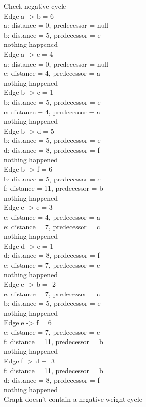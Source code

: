 \noindent Check negative cycle\\
Edge a -> b = 6\\
a: distance = 0, predecessor = null\\
b: distance = 5, predecessor = e\\
nothing happened\\
Edge a -> c = 4\\
a: distance = 0, predecessor = null\\
c: distance = 4, predecessor = a\\
nothing happened\\
Edge b -> c = 1\\
b: distance = 5, predecessor = e\\
c: distance = 4, predecessor = a\\
nothing happened\\
Edge b -> d = 5\\
b: distance = 5, predecessor = e\\
d: distance = 8, predecessor = f\\
nothing happened\\
Edge b -> f = 6\\
b: distance = 5, predecessor = e\\
f: distance = 11, predecessor = b\\
nothing happened\\
Edge c -> e = 3\\
c: distance = 4, predecessor = a\\
e: distance = 7, predecessor = c\\
nothing happened\\
Edge d -> e = 1\\
d: distance = 8, predecessor = f\\
e: distance = 7, predecessor = c\\
nothing happened\\
Edge e -> b = -2\\
e: distance = 7, predecessor = c\\
b: distance = 5, predecessor = e\\
nothing happened\\
Edge e -> f = 6\\
e: distance = 7, predecessor = c\\
f: distance = 11, predecessor = b\\
nothing happened\\
Edge f -> d = -3\\
f: distance = 11, predecessor = b\\
d: distance = 8, predecessor = f\\
nothing happened\\

\noindent Graph doesn't contain a negative-weight cycle
